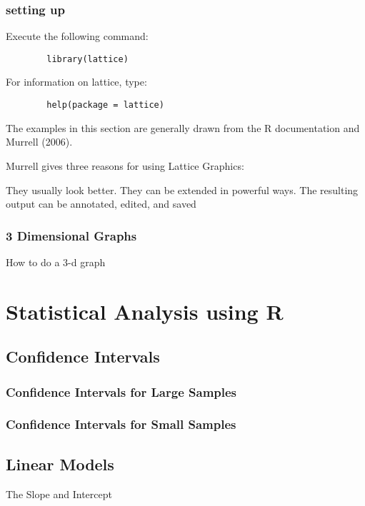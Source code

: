 \documentclass[a4paper,12pt]{article}
\begin{document}
	\subsection{setting up}
	Execute the following command:
	\begin{framed}
		\begin{verbatim}
		library(lattice)
		\end{verbatim}
	\end{framed}
	For information on lattice, type:
	\begin{framed}
		\begin{verbatim}
		help(package = lattice)
		\end{verbatim}
	\end{framed}
	The examples in this section are generally drawn from the R documentation and Murrell (2006).
	
	Murrell gives three reasons for using Lattice Graphics:
	
	They usually look better.
	They can be extended in powerful ways.
	The resulting output can be annotated, edited, and saved
	
	\subsection{3 Dimensional Graphs}
	How to do a 3-d graph
	
	\newpage
	\chapter{Statistical Analysis using R}
	\section{Confidence Intervals}
	\subsection{Confidence Intervals for Large Samples}
	\subsection{Confidence Intervals for Small Samples}
	
	\section{Linear Models}
	
	The Slope and Intercept
	\begin{framed}
		\begin{verbatim}
		
		\end{verbatim}
	\end{framed}
	
\end{document}
